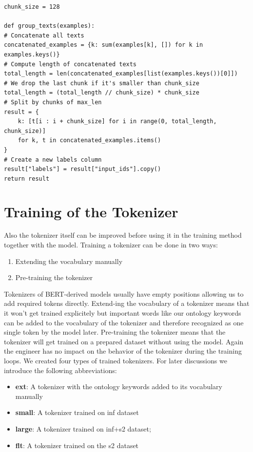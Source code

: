 \begin{code}
	\label{code:group_text}
	\begin{verbatim}
chunk_size = 128

def group_texts(examples):
# Concatenate all texts
concatenated_examples = {k: sum(examples[k], []) for k in examples.keys()}
# Compute length of concatenated texts
total_length = len(concatenated_examples[list(examples.keys())[0]])
# We drop the last chunk if it's smaller than chunk_size
total_length = (total_length // chunk_size) * chunk_size
# Split by chunks of max_len
result = {
	k: [t[i : i + chunk_size] for i in range(0, total_length, chunk_size)]
	for k, t in concatenated_examples.items()
}
# Create a new labels column
result["labels"] = result["input_ids"].copy()
return result
	\end{verbatim}
\end{code}


\section{Training of the Tokenizer}\label{sec:tokenizer}
Also the tokenizer itself can be improved before using it in the training method together with the model. Training a tokenizer can be done in two ways:

\begin{enumerate}
	\item Extending the vocabulary manually
	\item Pre-training the tokenizer 
\end{enumerate}

Tokenizers of BERT-derived models usually have empty positions allowing us to add required tokens directly. Extend-ing the vocabulary of a tokenizer means that it won’t get trained explicitely but important words like our ontology keywords can be added to the vocabulary of the tokenizer and therefore recognized as one single token by the model later. Pre-training the tokenizer means that the tokenizer will get trained on a prepared dataset without using the model. Again the engineer has no impact on the behavior of the tokenizer during the training loops. 
We created four types of trained tokenizers. For later discussions we introduce the following abbreviations:

\begin{itemize}
	\item \textbf{ext}: A tokenizer with the ontology keywords added to its vocabulary manually
	\item \textbf{small}: A tokenizer trained on inf dataset
	\item \textbf{large}: A tokenizer trained on inf+s2 dataset;
	\item \textbf{flt}: A tokenizer trained on the s2 dataset
\end{itemize}

